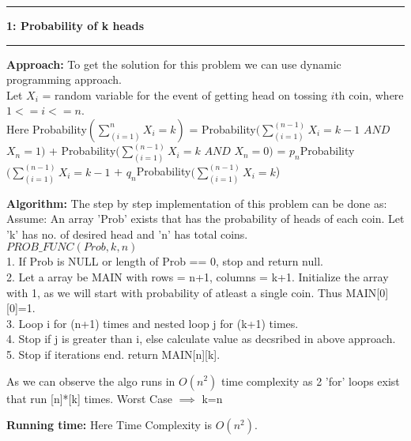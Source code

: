 \documentclass[11pt]{article}
\newcommand\question[2]{\vspace{.25in}\hrule\textbf{#1: #2}\vspace{.5em}\hrule\vspace{.10in}}
\newcommand\approach{\vspace{.10in}\textbf{Approach: }}
\newcommand\algorithm{\vspace{.10in}\textbf{Algorithm: }}
\newcommand\runtime{\vspace{.10in}\textbf{Running time: }}
\begin{document}
\raggedright
\newcommand\NAME{Aishwarya Asesh}  %
\newcommand\UID{u1063384}     %
\newcommand\HWNUM{2}              %



\question{1}{Probability of k heads}
\approach To get the solution for this problem we can use dynamic programming approach.\\
Let $X_i$ = random variable for the event of getting head on tossing $i$th coin, where $1<=i<=n$.\\
Here Probability$(\sum^n_{(i=1)}X_i = k)$ = Probability$(\sum^{(n-1)}_{(i=1)}X_i = k - 1$ $AND$ $X_n = 1)$ + Probability$(\sum^{(n-1)}_{(i=1)}X_i = k$ $AND$ $X_n = 0)$ = $p_n$Probability$(\sum^{(n-1)}_{(i=1)}X_i = k - 1$ + $q_n$Probability$(\sum^{(n-1)}_{(i=1)}X_i = k $)

\algorithm The step by step implementation of this problem can be done as:\\
Assume: An array 'Prob' exists that has the probability of heads of each coin. Let 'k' has no. of desired head and 'n' has total coins.\\
$PROB\_FUNC (Prob,k,n)$\\
1. If Prob is NULL or length of Prob == 0, stop and return null.
\\2. Let a array be MAIN with rows = n+1, columns = k+1. Initialize the array with 1, as we will start with probability of atleast a single coin. Thus MAIN[0][0]=1.
\\3. Loop i for (n+1) times and nested loop j for (k+1) times.
\\4. Stop if j is greater than i, else calculate value as decsribed in above approach.
\\5. Stop if iterations end. return MAIN[n][k].

As we can observe the algo runs in $O(n^2)$ time complexity as 2 'for' loops exist that run [n]*[k] times. Worst Case $\implies$ k=n  

\runtime Here Time Complexity is $O(n^2)$.
 
\end{document}
